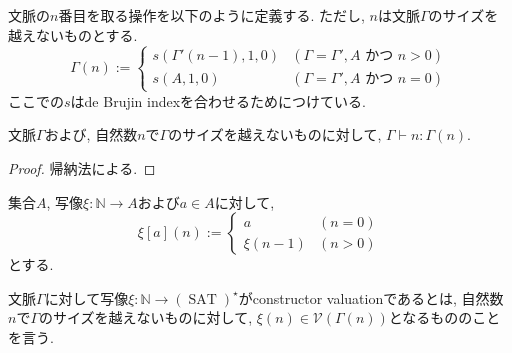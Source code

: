 \documentclass[12pt, titlepage]{ltjsarticle}
\DeclareMathOperator{\SAT}{SAT}
\begin{document}
\begin{defn}
 文脈の$n$番目を取る操作を以下のように定義する. ただし, $n$は文脈$\Gamma$のサイズを越えないものとする.
\[
  \Gamma (n) := \begin{cases}
    s (\Gamma' (n - 1), 1, 0) & (\Gamma = \Gamma', A  \text{ かつ } n > 0) \\
    s(A, 1, 0) & (\Gamma = \Gamma', A  \text{ かつ } n = 0)
  \end{cases}
\]
ここでの$s$はde Brujin indexを合わせるためにつけている.
\end{defn}

\begin{lem}
 文脈$\Gamma$および, 自然数$n$で$\Gamma$のサイズを越えないものに対して, $\Gamma \vdash n \colon \Gamma (n)$.
\end{lem}
\begin{proof}
 帰納法による.
\end{proof}

\begin{defn}
集合$A$, 写像$\xi : \mathbb{N} \rightarrow A$および$a \in A$に対して,
 \[
   \xi[a](n) := \begin{cases}
    a & (n = 0) \\
    \xi(n - 1) & (n > 0)
  \end{cases}
 \]
とする.
\end{defn}

\begin{defn}
 文脈$\Gamma$に対して写像$\xi : \mathbb{N} \rightarrow (\SAT)^\star$がconstructor valuationであるとは, 自然数$n$で$\Gamma$のサイズを越えないものに対して, $\xi (n) \in \mathcal{V}(\Gamma(n))$となるもののことを言う.
\end{defn}
\end{document}
